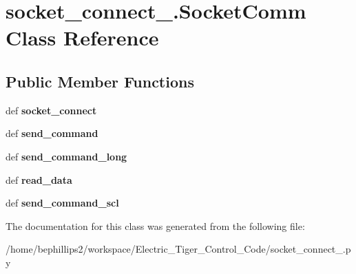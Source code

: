 \hypertarget{classsocket__connect__2_1_1_socket_comm}{\section{socket\-\_\-connect\-\_.\-Socket\-Comm Class Reference}
\label{classsocket__connect__2_1_1_socket_comm}
}
\subsection*{Public Member Functions}
\begin{DoxyCompactItemize}
\item 
\hypertarget{classsocket__connect__2_1_1_socket_comm_a5e25404a5cede82ac3141223cb12fc7e}{def {\bfseries socket\-\_\-connect}}\label{classsocket__connect__2_1_1_socket_comm_a5e25404a5cede82ac3141223cb12fc7e}

\item 
\hypertarget{classsocket__connect__2_1_1_socket_comm_a4070a886634e0e3f6f189b19f34636b0}{def {\bfseries send\-\_\-command}}\label{classsocket__connect__2_1_1_socket_comm_a4070a886634e0e3f6f189b19f34636b0}

\item 
\hypertarget{classsocket__connect__2_1_1_socket_comm_ab7566e585f4a41553a771a03e4ba50b1}{def {\bfseries send\-\_\-command\-\_\-long}}\label{classsocket__connect__2_1_1_socket_comm_ab7566e585f4a41553a771a03e4ba50b1}

\item 
\hypertarget{classsocket__connect__2_1_1_socket_comm_afb7a59e0928bfcc49956208dc881d794}{def {\bfseries read\-\_\-data}}\label{classsocket__connect__2_1_1_socket_comm_afb7a59e0928bfcc49956208dc881d794}

\item 
\hypertarget{classsocket__connect__2_1_1_socket_comm_a2822378a14b8aa204fa97ccf177e006a}{def {\bfseries send\-\_\-command\-\_\-scl}}\label{classsocket__connect__2_1_1_socket_comm_a2822378a14b8aa204fa97ccf177e006a}

\end{DoxyCompactItemize}


The documentation for this class was generated from the following file\-:\begin{DoxyCompactItemize}
\item 
/home/bephillips2/workspace/\-Electric\-\_\-\-Tiger\-\_\-\-Control\-\_\-\-Code/socket\-\_\-connect\-\_.\-py\end{DoxyCompactItemize}
